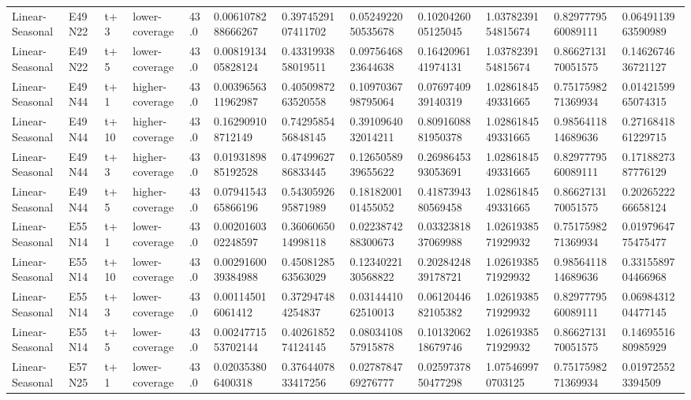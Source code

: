 \begin{landscape}
\begin{longtable}{llllllllllll}
Linear-Seasonal & E49N22 & t+3 & lower-coverage & 43.0 & 0.0061078288666267 & 0.3974529107411702 & 0.0524922050535678 & 0.1020426005125045 & 1.0378239154815674 & 0.8297779560089111 & 0.0649113963590989 \\
Linear-Seasonal & E49N22 & t+5 & lower-coverage & 43.0 & 0.0081913405828124 & 0.4331993858019511 & 0.0975646823644638 & 0.1642096141974131 & 1.0378239154815674 & 0.8662713170051575 & 0.1462674636721127 \\
Linear-Seasonal & E49N44 & t+1 & higher-coverage & 43.0 & 0.0039656311962987 & 0.4050987263520558 & 0.1097036798795064 & 0.0769740939140319 & 1.0286184549331665 & 0.7517598271369934 & 0.0142159965074315 \\
Linear-Seasonal & E49N44 & t+10 & higher-coverage & 43.0 & 0.162909108712149 & 0.7429585456848145 & 0.3910964032014211 & 0.8091608881950378 & 1.0286184549331665 & 0.9856411814689636 & 0.2716841861229715 \\
Linear-Seasonal & E49N44 & t+3 & higher-coverage & 43.0 & 0.0193189885192528 & 0.4749962786833445 & 0.1265058939655622 & 0.2698645393053691 & 1.0286184549331665 & 0.8297779560089111 & 0.1718827387776129 \\
Linear-Seasonal & E49N44 & t+5 & higher-coverage & 43.0 & 0.0794154365866196 & 0.5430592695871989 & 0.1818200101455052 & 0.4187394380569458 & 1.0286184549331665 & 0.8662713170051575 & 0.2026522266658124 \\
Linear-Seasonal & E55N14 & t+1 & lower-coverage & 43.0 & 0.0020160302248597 & 0.3606065014998118 & 0.0223874288300673 & 0.0332381837069988 & 1.0261938571929932 & 0.7517598271369934 & 0.0197964775475477 \\
Linear-Seasonal & E55N14 & t+10 & lower-coverage & 43.0 & 0.0029160039384988 & 0.4508128563563029 & 0.1234022130568822 & 0.2028424839178721 & 1.0261938571929932 & 0.9856411814689636 & 0.3315589704466968 \\
Linear-Seasonal & E55N14 & t+3 & lower-coverage & 43.0 & 0.001145016061412 & 0.372947484254837 & 0.0314441062510013 & 0.0612044682105382 & 1.0261938571929932 & 0.8297779560089111 & 0.0698431204477145 \\
Linear-Seasonal & E55N14 & t+5 & lower-coverage & 43.0 & 0.0024771553702144 & 0.4026185274124145 & 0.0803410857915878 & 0.1013206218679746 & 1.0261938571929932 & 0.8662713170051575 & 0.1469551680985929 \\
Linear-Seasonal & E57N25 & t+1 & lower-coverage & 43.0 & 0.020353806400318 & 0.3764407833417256 & 0.0278784769276777 & 0.0259737850477298 & 1.075469970703125 & 0.7517598271369934 & 0.019725523394509 \\

\end{longtable}
\end{landscape}
